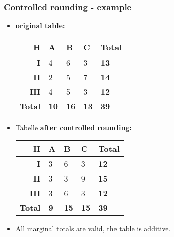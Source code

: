 \begin{frame}\frametitle{Controlled rounding - example}
	\begin{itemize}
		\item {\bf original table:}\\
		\begin{scriptsize}
		\begin{center}
			\begin{tabular}{|r|lll|l|}
			\hline
			{\bf H} & {\bf A} & {\bf B} & {\bf C} & {\bf Total} \\
			\hline
			{\bf I} 	& 4 & 6 & 3 & {\bf 13} \\
			{\bf II} 	& 2 & 5 & 7 & {\bf 14}\\
			{\bf III} & 4 & 5 & 3 & {\bf 12} \\
			\hline
			{\bf Total} & {\bf 10} & {\bf 16} & {\bf 13}  & {\bf 39} \\
			\hline
			\end{tabular}
		\end{center}
		\end{scriptsize} \pause
		\item Tabelle {\bf after controlled rounding:} \\
		\begin{scriptsize}
		\begin{center}
			\begin{tabular}{|r|lll|l|}
			\hline
			{\bf H} & {\bf A} & {\bf B} & {\bf C} & {\bf Total} \\
			\hline
			{\bf I} 	& 3 & 6 & 3 & {\bf 12} \\
			{\bf II} 	& 3 & 3 & 9 & {\bf 15}\\
			{\bf III} & 3 & 6 & 3 & {\bf 12} \\
			\hline
			{\bf Total} & {\bf 9} & {\bf 15} & {\bf 15}  & {\bf 39} \\
			\hline
			\end{tabular}
		\end{center}
		\end{scriptsize}	\pause
		\item All marginal totals are valid, the table is additive.
	\end{itemize}
\end{frame}

